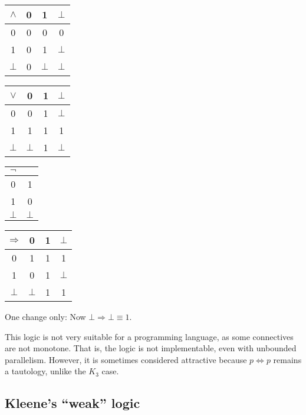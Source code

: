 \documentclass{llncs}
\newcommand{\impl}{\mathbin{\Rightarrow}}
\newcommand{\biim}{\mathbin{\Leftrightarrow}}
\begin{document}
\begin{center}
\begin{tabular}{|c|ccc|}
\hline
   $\land$& 0 & 1 & $\bot$
\\ \hline
   0      & 0 & 0 & 0
\\ 1      & 0 & 1 & $\bot$
\\ $\bot$ & 0 & $\bot$ & $\bot$
\\ \hline
\end{tabular}
\hfil
\begin{tabular}{|c|ccc|}
\hline
   $\lor$ & 0 & 1 & $\bot$
\\ \hline
   0      & 0 & 1 & $\bot$
\\ 1      & 1 & 1 & 1
\\ $\bot$ & $\bot$ & 1 & $\bot$
\\ \hline
\end{tabular}
\hfil
\begin{tabular}{|c|c|}
\hline
   $\neg$ &
\\ \hline
   0      & 1
\\ 1      & 0
\\ $\bot$ & $\bot$
\\ \hline
\end{tabular}
\hfil
\begin{tabular}{|c|ccc|}
\hline
   $\impl$ & 0 & 1 & $\bot$
\\ \hline
   0      & 1 & 1 & 1
\\ 1      & 0 & 1 & $\bot$
\\ $\bot$ & $\bot$ & 1 & 1
\\ \hline
\end{tabular}
\end{center}
%
One change only:
Now $\bot \impl \bot \equiv 1$.

This logic is not very suitable for a programming language,
as some connectives are not monotone.
That is, the logic is not implementable, even with unbounded parallelism.
However, it is sometimes considered attractive because $p \biim p$ remains
a tautology, unlike the $K_3$ case.


\subsection{Kleene's ``weak'' logic}
\end{document}
